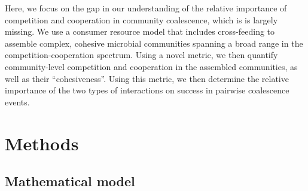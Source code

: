 \documentclass[10pt,letterpaper]{article}
\begin{document}
Here, we focus on the gap in our understanding of the relative importance of competition and cooperation in community coalescence, which is is largely missing. We use a consumer resource model that includes cross-feeding to assemble complex, cohesive microbial communities spanning a broad range in the competition-cooperation spectrum. Using a novel metric, we then quantify community-level competition and cooperation in the assembled communities, as well as their ``cohesiveness''. Using this metric, we then determine the relative importance of the two types of interactions on success in pairwise coalescence events. %

\section*{Methods}

\subsection*{Mathematical model}
\end{document}
